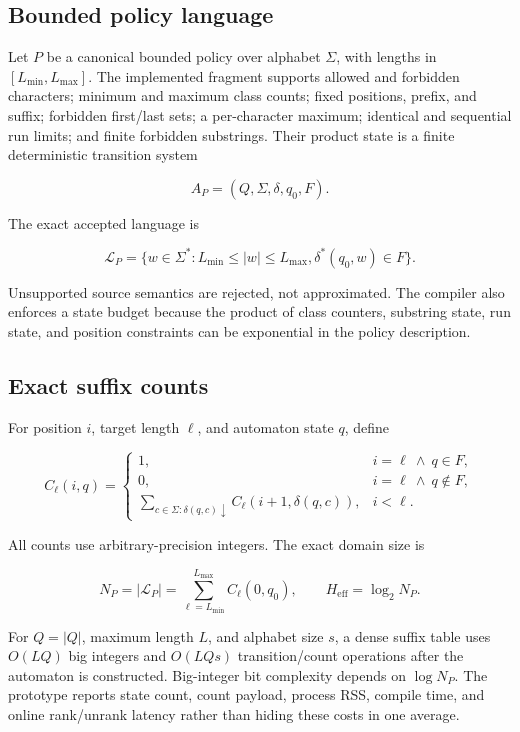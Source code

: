 \documentclass[preprint,12pt]{elsarticle}
\newcommand{\Lang}{\mathcal{L}}
\begin{document}
\subsection{Bounded policy language}

Let $P$ be a canonical bounded policy over alphabet $\Sigma$, with lengths in
$[L_{\min},L_{\max}]$. The implemented fragment supports allowed and forbidden
characters; minimum and maximum class counts; fixed positions, prefix, and
suffix; forbidden first/last sets; a per-character maximum; identical and
sequential run limits; and finite forbidden substrings. Their product state is
a finite deterministic transition system

\[
 A_P=(Q,\Sigma,\delta,q_0,F).
\]

The exact accepted language is

\[
 \Lang_P=\{w\in\Sigma^*:L_{\min}\le |w|\le L_{\max},
                         \delta^*(q_0,w)\in F\}.
\]

Unsupported source semantics are rejected, not approximated. The compiler also
enforces a state budget because the product of class counters, substring state,
run state, and position constraints can be exponential in the policy
description.

\subsection{Exact suffix counts}

For position $i$, target length $\ell$, and automaton state $q$, define

\[
C_\ell(i,q)=
\begin{cases}
1,& i=\ell\ \land\ q\in F,\\
0,& i=\ell\ \land\ q\notin F,\\
\sum_{c\in\Sigma:\delta(q,c)\downarrow}
  C_\ell(i+1,\delta(q,c)),& i<\ell.
\end{cases}
\]

All counts use arbitrary-precision integers. The exact domain size is

\[
 N_P=|\Lang_P|=\sum_{\ell=L_{\min}}^{L_{\max}}C_\ell(0,q_0),
 \qquad H_{\mathrm{eff}}=\log_2 N_P.
\]

For $Q=|Q|$, maximum length $L$, and alphabet size $s$, a dense suffix table
uses $O(LQ)$ big integers and $O(LQs)$ transition/count operations after the
automaton is constructed. Big-integer bit complexity depends on $\log N_P$.
The prototype reports state count, count payload, process RSS, compile time,
and online rank/unrank latency rather than hiding these costs in one average.
\end{document}
